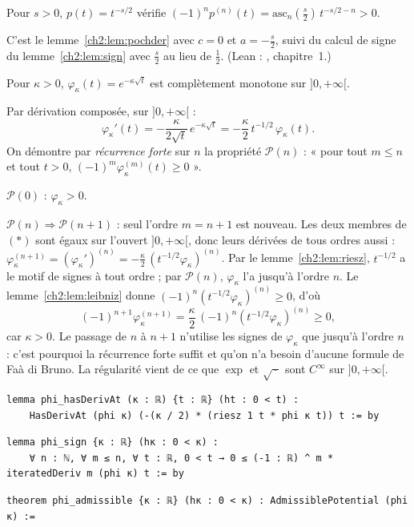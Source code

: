 \begin{lemma}[$t^{-s/2}$ est CM]\label{ch2:lem:riesz}
Pour $s>0$, $p(t)=t^{-s/2}$ vérifie $(-1)^np^{(n)}(t)=\mathrm{asc}_n(\tfrac s2)\,t^{-s/2-n}>0$.
\end{lemma}
\begin{humanproof}
C'est le lemme~\ref{ch2:lem:pochder} avec $c=0$ et $a=-\tfrac s2$, suivi du calcul de signe du lemme~\ref{ch2:lem:sign}
avec $\tfrac s2$ au lieu de $\tfrac12$. (Lean : , chapitre~1.)
\end{humanproof}

\begin{proposition}\label{ch2:prop:phi}
Pour $\kappa>0$, $\varphi_\kappa(t)=e^{-\kappa\sqrt t}$ est complètement monotone sur $]0,+\infty[$.
\end{proposition}
\begin{humanproof}
Par dérivation composée, sur $]0,+\infty[$ :
\[\varphi_\kappa'(t)=-\frac{\kappa}{2\sqrt t}\,e^{-\kappa\sqrt t}=-\frac\kappa2\,t^{-1/2}\,\varphi_\kappa(t).\tag{$\ast$}\]
On démontre par \emph{récurrence forte} sur $n$ la propriété $\mathcal P(n)$ : « pour tout $m\le n$ et tout $t>0$,
$(-1)^m\varphi_\kappa^{(m)}(t)\ge0$ ».

$\mathcal P(0)$ : $\varphi_\kappa>0$.

$\mathcal P(n)\Rightarrow\mathcal P(n+1)$ : seul l'ordre $m=n+1$ est nouveau. Les deux membres de $(\ast)$ sont égaux sur
l'ouvert $]0,+\infty[$, donc leurs dérivées de tous ordres aussi : $\varphi_\kappa^{(n+1)}=(\varphi_\kappa')^{(n)}
=-\frac\kappa2\,(t^{-1/2}\varphi_\kappa)^{(n)}$. Par le lemme~\ref{ch2:lem:riesz}, $t^{-1/2}$ a le motif de signes à tout
ordre ; par $\mathcal P(n)$, $\varphi_\kappa$ l'a jusqu'à l'ordre $n$. Le lemme~\ref{ch2:lem:leibniz} donne
$(-1)^n(t^{-1/2}\varphi_\kappa)^{(n)}\ge0$, d'où
\[(-1)^{n+1}\varphi_\kappa^{(n+1)}=\frac\kappa2\,(-1)^n(t^{-1/2}\varphi_\kappa)^{(n)}\ge0,\]
car $\kappa>0$. Le passage de $n$ à $n+1$ n'utilise les signes de $\varphi_\kappa$ que jusqu'à l'ordre $n$ : c'est
pourquoi la récurrence forte suffit et qu'on n'a besoin d'aucune formule de Faà di Bruno. La régularité vient de ce que
$\exp$ et $\sqrt{\,\cdot\,}$ sont $C^\infty$ sur $]0,+\infty[$.
\end{humanproof}
\begin{leanbox}
\begin{lstlisting}[style=chdeux]
lemma phi_hasDerivAt (κ : ℝ) {t : ℝ} (ht : 0 < t) :
    HasDerivAt (phi κ) (-(κ / 2) * (riesz 1 t * phi κ t)) t := by
\end{lstlisting}
\begin{lstlisting}[style=chdeux]
lemma phi_sign {κ : ℝ} (hκ : 0 < κ) :
    ∀ n : ℕ, ∀ m ≤ n, ∀ t : ℝ, 0 < t → 0 ≤ (-1 : ℝ) ^ m * iteratedDeriv m (phi κ) t := by
\end{lstlisting}
\begin{lstlisting}[style=chdeux]
theorem phi_admissible {κ : ℝ} (hκ : 0 < κ) : AdmissiblePotential (phi κ) :=
\end{lstlisting}
\end{leanbox}
